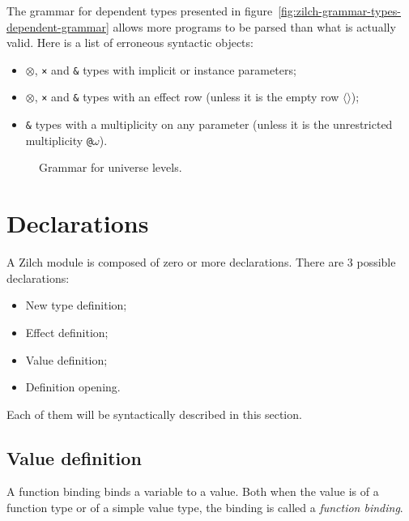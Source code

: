 \begin{warningbox}
	The grammar for dependent types presented in figure~\ref{fig:zilch-grammar-types-dependent-grammar} allows more programs to be parsed than what is actually valid.
	Here is a list of erroneous syntactic objects:
	\begin{itemize}
		\item \texttt{$\otimes$}, \texttt{×} and \texttt{\&} types with implicit or instance parameters;
		\item \texttt{$\otimes$}, \texttt{×} and \texttt{\&} types with an effect row (unless it is the empty row \texttt{$\langle\rangle$});
		\item \texttt{\&} types with a multiplicity on any parameter (unless it is the unrestricted multiplicity \texttt{@$\omega$}).
	\end{itemize}
\end{warningbox}

\begin{figure}[H]
	\centering


	\caption{Grammar for universe levels.}
	\label{fig:zilch-grammar-types-level-grammar}
\end{figure}

\section{Declarations}\label{sec:zilch-grammar-declarations}

A Zilch module is composed of zero or more declarations.
There are 3 possible declarations:
\begin{itemize}
	\item New type definition;
	\item Effect definition;
	\item Value definition;
	\item Definition opening.
\end{itemize}

\noindent Each of them will be syntactically described in this section.

\subsection{Value definition}\label{subsec:zilch-grammar-declarations-value}

A function binding binds a variable to a value.
Both when the value is of a function type or of a simple value type, the binding is called a \textit{function binding}.
\vspace*{\baselineskip}

